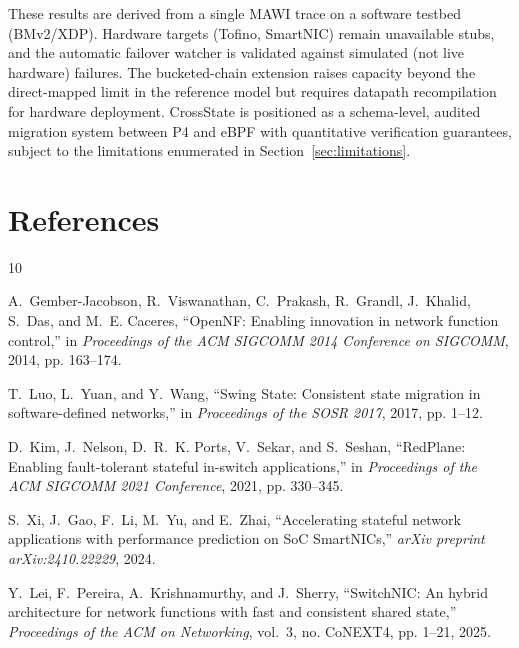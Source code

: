 \documentclass[10pt, conference]{IEEEtran}
\begin{document}
These results are derived from a single MAWI trace on a software testbed (BMv2/XDP). Hardware targets (Tofino, SmartNIC) remain unavailable stubs, and the automatic failover watcher is validated against simulated (not live hardware) failures. The bucketed-chain extension raises capacity beyond the direct-mapped limit in the reference model but requires datapath recompilation for hardware deployment. CrossState is positioned as a schema-level, audited migration system between P4 and eBPF with quantitative verification guarantees, subject to the limitations enumerated in Section~\ref{sec:limitations}.

\section{References}
\label{sec:references}
\begin{thebibliography}{10}

A.~Gember-Jacobson, R.~Viswanathan, C.~Prakash, R.~Grandl, J.~Khalid, S.~Das,
and M.~E. Caceres, ``OpenNF: Enabling innovation in network function control,''
in \emph{Proceedings of the ACM SIGCOMM 2014 Conference on SIGCOMM}, 2014,
pp. 163--174.

T.~Luo, L.~Yuan, and Y.~Wang, ``Swing State: Consistent state migration in
software-defined networks,'' in \emph{Proceedings of the SOSR 2017}, 2017,
pp. 1--12.

D.~Kim, J.~Nelson, D.~R.~K. Ports, V.~Sekar, and S.~Seshan, ``RedPlane:
Enabling fault-tolerant stateful in-switch applications,'' in
\emph{Proceedings of the ACM SIGCOMM 2021 Conference}, 2021, pp. 330--345.

S.~Xi, J.~Gao, F.~Li, M.~Yu, and E.~Zhai, ``Accelerating stateful network
applications with performance prediction on SoC SmartNICs,''
\emph{arXiv preprint arXiv:2410.22229}, 2024.

Y.~Lei, F.~Pereira, A.~Krishnamurthy, and J.~Sherry, ``SwitchNIC: An hybrid
architecture for network functions with fast and consistent shared state,''
\emph{Proceedings of the ACM on Networking}, vol.~3, no. CoNEXT4, pp. 1--21,
2025.

\end{thebibliography}
\end{document}

